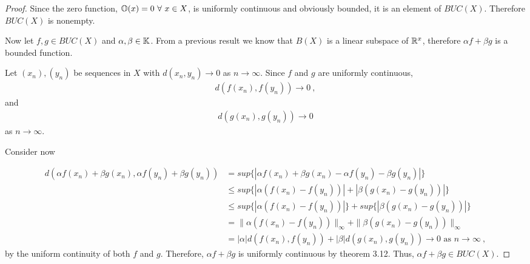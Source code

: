 \begin{questions}


\begin{solution}
  \begin{proof}
 Since the zero function, $\mathbb{O} (x) = 0~ \forall ~x \in X$, is uniformly continuous and obviously bounded, it is an element of $BUC(X)$. Therefore $BUC(X)$ is nonempty.
 
 Now let $f,g \in BUC(X)$ and $\alpha,\beta \in \mathbb{K}$. From a previous result we know that $B(X)$ is a linear subspace of $\mathbb{R}^x$, therefore $\alpha f+\beta g$ is a bounded function.
 
 Let $(x_n),(y_n)$ be sequences in $X$ with $d(x_n, y_n) \rightarrow 0$ as $n \rightarrow \infty$. Since $f$ and $g$ are uniformly continuous,
 \begin{align*}
 d(f(x_n),f(y_n)) \rightarrow 0~,
 \end{align*}
and
\begin{align*}
d(g(x_n),g(y_n)) \rightarrow 0
\end{align*}
as $n \rightarrow \infty$.

Consider now

\begin{align*}
d(\alpha f(x_n) + \beta g(x_n), \alpha f(y_n) + \beta g(y_n)) &= sup\{|\alpha f(x_n) + \beta g(x_n) - \alpha f(y_n) - \beta g(y_n)|\} \\
& \leq sup\{|\alpha (f(x_n) - f(y_n))|+|\beta (g(x_n) - g(y_n))|\} \\
& \leq sup\{|\alpha (f(x_n) - f(y_n))|\}+sup\{|\beta (g(x_n) - g(y_n))|\} \\
& = \|\alpha (f(x_n) - f(y_n))\|_{\infty}+\|\beta (g(x_n) - g(y_n))\|_{\infty} \\
& = |\alpha | d(f(x_n),f(y_n)) + | \beta| d(g(x_n), g(y_n))\rightarrow 0 \text{ as } n\rightarrow\infty~,
\end{align*}
by the uniform continuity of both $f$ and $g$. Therefore, $\alpha f + \beta g$ is uniformly continuous by theorem 3.12. Thus, $\alpha f + \beta g\in BUC(X)$.


\end{proof}
\end{solution}
\end{questions}
